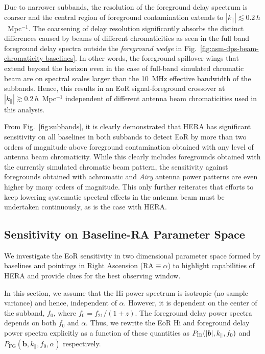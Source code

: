 \documentclass[preprint2,iop,numberedappendix,twocolappendix,appendixfloats]{emulateapj}
\begin{document}
Due to narrower subbands, the resolution of the foreground delay spectrum is coarser and the central region of foreground contamination extends to $|k_\parallel| \lesssim 0.2\,h$~Mpc$^{-1}$. The coarsening of delay resolution significantly absorbs the distinct differences caused by beams of different chromaticities as seen in the full band foreground delay spectra outside the {\it foreground wedge} in Fig.~\ref{fig:asm-dps-beam-chromaticity-baselines}. In other words, the foreground spillover wings that extend beyond the horizon even in the case of full-band simulated chromatic beam are on spectral scales larger than the 10~MHz effective bandwidth of the subbands. Hence, this results in an EoR signal-foreground crossover at $|k_\parallel| \gtrsim 0.2\,h$~Mpc$^{-1}$ independent of different antenna beam chromaticities used in this analysis. 

From Fig.~\ref{fig:subbands}, it is clearly demonstrated that HERA has significant sensitivity on all baselines in both subbands to detect EoR by more than two orders of magnitude above foreground contamination obtained with any level of antenna beam chromaticity. While this clearly includes foregrounds obtained with the currently simulated chromatic beam pattern, the sensitivity against foregrounds obtained with achromatic and {\it Airy} antenna power patterns are even higher by many orders of magnitude. This only further reiterates that efforts to keep lowering systematic spectral effects in the antenna beam must be undertaken continuously, as is the case with HERA.

\subsection{Sensitivity on Baseline-RA Parameter Space}\label{sec:baseline-LST}

We investigate the EoR sensitivity in two dimensional parameter space formed by baselines and pointings in Right Ascension (RA$\equiv\alpha$) to highlight capabilities of HERA and provide clues for the best observing window. 

In this section, we assume that the H{\sc i} power spectrum is isotropic (no sample variance) and hence, independent of $\alpha$. However, it is dependent on the center of the subband, $f_0$, where $f_0 = f_{21}/(1+z)$. The foreground delay power spectra depends on both $f_0$ and $\alpha$. Thus, we rewrite the EoR H{\sc i} and foreground delay power spectra explicitly as a function of these quantities as $P_\textrm{H{\sc i}}(|\boldsymbol{b}|,k_\parallel,f_0)$ and $P_\textrm{FG}(\boldsymbol{b},k_\parallel,f_0,\alpha)$ respectively.
\end{document}
